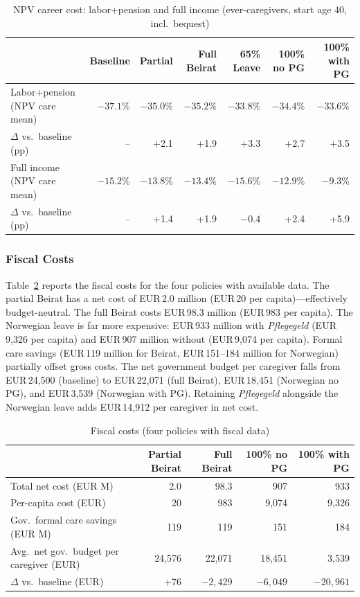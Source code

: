\begin{table}[htbp]
  \centering
  \caption{NPV career cost: labor+pension and full income (ever-caregivers, start age 40, incl.\ bequest)}
  \label{tab:policy_npv}
  \small
  \begin{tabular}{lrrrrrr}
    \toprule
    & Baseline & Partial & Full Beirat & 65\% Leave & 100\% no PG & 100\% with PG \\
    \midrule
    Labor+pension (NPV care mean) & $-37.1\%$ & $-35.0\%$ & $-35.2\%$ & $-33.8\%$ & $-34.4\%$ & $-33.6\%$ \\
    $\Delta$ vs.\ baseline (pp) & -- & +2.1 & +1.9 & +3.3 & +2.7 & +3.5 \\
    Full income (NPV care mean) & $-15.2\%$ & $-13.8\%$ & $-13.4\%$ & $-15.6\%$ & $-12.9\%$ & $-9.3\%$ \\
    $\Delta$ vs.\ baseline (pp) & -- & +1.4 & +1.9 & $-0.4$ & +2.4 & +5.9 \\
    \bottomrule
  \end{tabular}
\end{table}

\subsubsection{Fiscal Costs}

Table~\ref{tab:policy_fiscal} reports the fiscal costs for the four policies with available data. The partial Beirat has a net cost of EUR\,2.0 million (EUR\,20 per capita)---effectively budget-neutral. The full Beirat costs EUR\,98.3 million (EUR\,983 per capita). The Norwegian leave is far more expensive: EUR\,933 million with \textit{Pflegegeld} (EUR\,9,326 per capita) and EUR\,907 million without (EUR\,9,074 per capita). Formal care savings (EUR\,119 million for Beirat, EUR\,151--184 million for Norwegian) partially offset gross costs. The net government budget per caregiver falls from EUR\,24,500 (baseline) to EUR\,22,071 (full Beirat), EUR\,18,451 (Norwegian no PG), and EUR\,3,539 (Norwegian with PG). Retaining \textit{Pflegegeld} alongside the Norwegian leave adds EUR\,14,912 per caregiver in net cost.

\begin{table}[htbp]
  \centering
  \caption{Fiscal costs (four policies with fiscal data)}
  \label{tab:policy_fiscal}
  \small
  \begin{tabular}{lrrrr}
    \toprule
    & Partial Beirat & Full Beirat & 100\% no PG & 100\% with PG \\
    \midrule
    Total net cost (EUR M) & 2.0 & 98.3 & 907 & 933 \\
    Per-capita cost (EUR) & 20 & 983 & 9,074 & 9,326 \\
    Gov.\ formal care savings (EUR M) & 119 & 119 & 151 & 184 \\
    Avg.\ net gov.\ budget per caregiver (EUR) & 24,576 & 22,071 & 18,451 & 3,539 \\
    $\Delta$ vs.\ baseline (EUR) & +76 & $-2,429$ & $-6,049$ & $-20,961$ \\
    \bottomrule
  \end{tabular}
\end{table}

